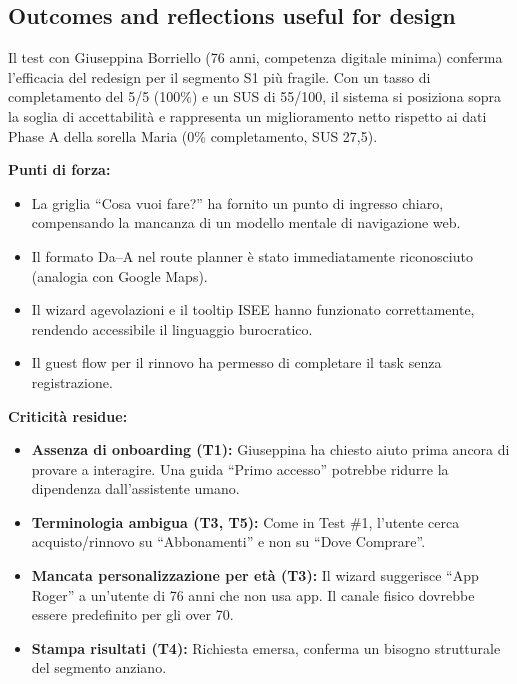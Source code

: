 ﻿\documentclass[11pt,a4paper]{article}
\begin{document}
\subsection*{Outcomes and reflections useful for design}
\begin{tcolorbox}[base]
Il test con Giuseppina Borriello (76 anni, competenza
digitale minima) conferma l'efficacia del redesign per il
segmento S1 più fragile. Con un tasso di completamento del
5/5 (100\%) e un SUS di 55/100, il sistema si posiziona
sopra la soglia di accettabilità e rappresenta un
miglioramento netto rispetto ai dati Phase A della sorella
Maria (0\% completamento, SUS 27,5).

\medskip

\noindent\textbf{Punti di forza:}
\begin{itemize}[leftmargin=*]
  \item La griglia ``Cosa vuoi fare?'' ha fornito un punto
  di ingresso chiaro, compensando la mancanza di un modello
  mentale di navigazione web.
  \item Il formato Da--A nel route planner è stato
  immediatamente riconosciuto (analogia con Google Maps).
  \item Il wizard agevolazioni e il tooltip ISEE hanno
  funzionato correttamente, rendendo accessibile il
  linguaggio burocratico.
  \item Il guest flow per il rinnovo ha permesso di
  completare il task senza registrazione.
\end{itemize}

\medskip

\noindent\textbf{Criticità residue:}
\begin{itemize}[leftmargin=*]
  \item \textbf{Assenza di onboarding (T1):} Giuseppina ha
  chiesto aiuto prima ancora di provare a interagire. Una
  guida ``Primo accesso'' potrebbe ridurre la dipendenza
  dall'assistente umano.
  \item \textbf{Terminologia ambigua (T3, T5):} Come in
  Test \#1, l'utente cerca acquisto/rinnovo su
  ``Abbonamenti'' e non su ``Dove Comprare''.
  \item \textbf{Mancata personalizzazione per età (T3):}
  Il wizard suggerisce ``App Roger'' a un'utente di 76 anni
  che non usa app. Il canale fisico dovrebbe essere
  predefinito per gli over 70.
  \item \textbf{Stampa risultati (T4):} Richiesta emersa, conferma un bisogno strutturale del
  segmento anziano.
\end{itemize}

\end{tcolorbox}
\end{document}
